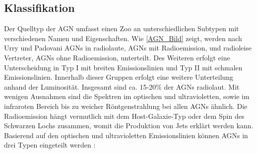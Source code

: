 \subsection{Klassifikation}
\label{subsec:Klassifikation}
Der Quelltyp der AGN umfasst einen Zoo an unterschiedlichen Subtypen mit verschiedenen Namen und Eigenschaften.
Wie \autoref{AGN_Bild} zeigt, werden nach Urry und Padovani \cite{Urry_Padovani} AGNs in radiolaute, AGNs mit Radioemission, und radioleise Vertreter, AGNs ohne Radioemission, unterteilt.
Des Weiteren erfolgt eine Unterscheidung in Typ I mit breiten Emissionslinien und Typ II mit schmalen Emissionslinien.
Innerhalb dieser Gruppen erfolgt eine weitere Unterteilung anhand der Luminosität.
Insgesamt sind ca. 15-20\% \cite{Urry_Padovani} der AGNs radiolaut.
Mit wenigen Ausnahmen sind die Spektren im optischen und ultravioletten, sowie im infraroten Bereich bis zu weicher Röntgenstrahlung bei allen AGNs ähnlich.
Die Radioemission hängt vermutlich mit dem Host-Galaxie-Typ oder dem Spin des Schwarzen Lochs zusammen, womit die Produktion von Jets erklärt werden kann.
Basierend auf den optischen und ultravioletten Emissionslinien können AGNs in drei Typen eingeteilt werden \cite{Urry_Padovani}:

